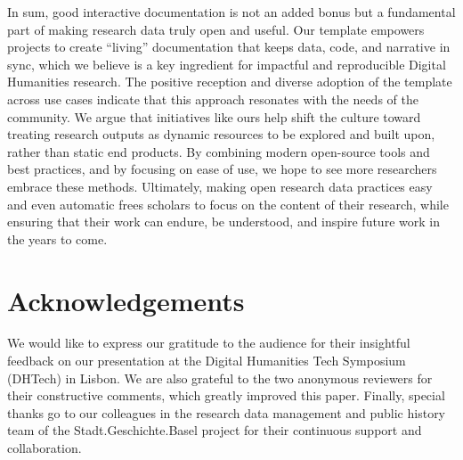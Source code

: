 \documentclass[final]{anthology-ch} %
\begin{document}
In sum, good interactive documentation is not an added bonus but a fundamental part of making research data truly open and useful. Our template empowers projects to create ``living'' documentation that keeps data, code, and narrative in sync, which we believe is a key ingredient for impactful and reproducible Digital Humanities research. The positive reception and diverse adoption of the template across use cases indicate that this approach resonates with the needs of the community. We argue that initiatives like ours help shift the culture toward treating research outputs as dynamic resources to be explored and built upon, rather than static end products. By combining modern open-source tools and best practices, and by focusing on ease of use, we hope to see more researchers embrace these methods. Ultimately, making open research data practices easy and even automatic frees scholars to focus on the content of their research, while ensuring that their work can endure, be understood, and inspire future work in the years to come.

\section*{Acknowledgements}

We would like to express our gratitude to the audience for their insightful feedback on our presentation at the Digital Humanities Tech Symposium (DHTech) in Lisbon. We are also grateful to the two anonymous reviewers for their constructive comments, which greatly improved this paper. Finally, special thanks go to our colleagues in the research data management and public history team of the Stadt.Geschichte.Basel project for their continuous support and collaboration.

\printbibliography



\end{document}
